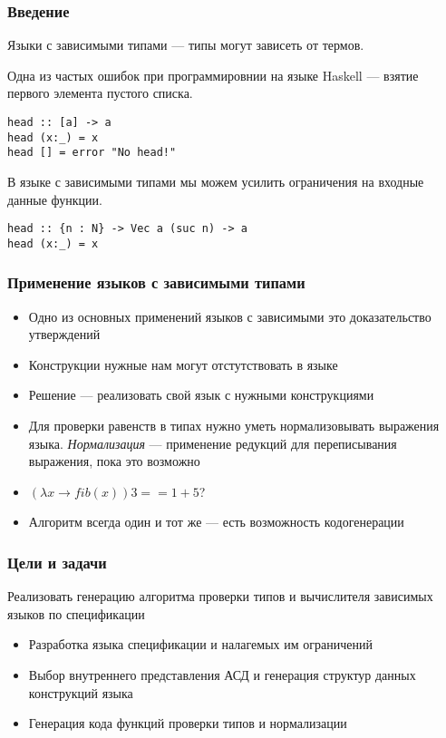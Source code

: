 
\begin{frame}[fragile]
\frametitle{Введение}

Языки с зависимыми типами --- типы могут зависеть от термов.

Одна из частых ошибок при программировнии на языке Haskell --- взятие первого элемента пустого списка.

\begin{verbatim}
head :: [a] -> a
head (x:_) = x
head [] = error "No head!"
\end{verbatim}

В языке с зависимыми типами мы можем усилить ограничения на входные данные функции.

\begin{verbatim}
head :: {n : N} -> Vec a (suc n) -> a
head (x:_) = x
\end{verbatim}

\end{frame}

\begin{frame}
\frametitle{Применение языков с зависимыми типами}

\begin{itemize}
\item Одно из основных применений языков с зависимыми это доказательство утверждений
\item Конструкции нужные нам могут отстутствовать в языке
\item Решение --- реализовать свой язык с нужными конструкциями
\item Для проверки равенств в типах нужно уметь нормализовывать выражения языка.
\textit{Нормализация} --- применение редукций для переписывания выражения, пока это возможно
\item $(\lambda x \rightarrow fib(x)) 3 == 1 + 5$?
\item Алгоритм всегда один и тот же --- есть возможность кодогенерации
\end{itemize}
\end{frame}

\begin{frame}
\frametitle{Цели и задачи}
Реализовать генерацию алгоритма проверки типов и вычислителя зависимых языков по спецификации

\begin{itemize}
\item Разработка языка спецификации и налагемых им ограничений
\item Выбор внутреннего представления АСД и генерация структур данных конструкций языка
\item Генерация кода функций проверки типов и нормализации
\end{itemize}
\end{frame}

